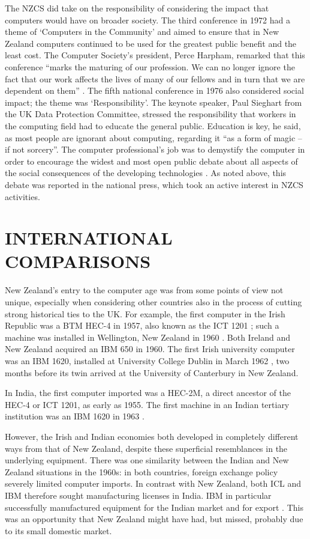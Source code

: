\documentclass{IEEEcsmag}
\begin{document}
The NZCS did take on the responsibility of considering the impact that computers would have on 
broader society. The third conference in 1972 had a theme of ‘Computers in the Community’ and
aimed to ensure that in New Zealand computers continued to be used for the greatest public benefit
and the least cost. The Computer Society’s president, Perce Harpham, remarked that this conference
“marks the maturing of our profession. We can no longer ignore the fact that our work affects the lives 
of many of our fellows and in turn that we are dependent on them” \cite{Harpham1972}. The fifth national conference in 
1976 also considered social impact; the theme was  ‘Responsibility’.  The keynote speaker, Paul Sieghart 
from the UK Data Protection Committee, stressed the responsibility that workers in the computing field 
had to educate the general public. Education is key, he said, as most people are ignorant about computing, 
regarding it “as a form of magic – if not sorcery”. The computer professional’s job was to demystify the 
computer in order to encourage the widest and most open public debate about all aspects of the social 
consequences of the developing technologies \cite{Sieghart1976}.
As noted above, this debate was reported in the national press, which took an active interest in NZCS activities.
\vspace*{-8pt}
\section{INTERNATIONAL COMPARISONS}
New Zealand’s entry to the computer age was from some points of view not unique,
especially when considering other countries also in the process of cutting strong historical ties to the UK.
For example, the first computer in the Irish Republic was a BTM HEC-4 in 1957,
also known as the ICT 1201 \cite{Ireland-first}; such a machine was installed in
Wellington, New Zealand in 1960 \cite{FirstCinNZ}. Both Ireland and New Zealand
acquired an IBM 650 in 1960. The first Irish university computer was an IBM 1620, 
installed at University College Dublin in March 1962 \cite{Ireland-first}, two months before its twin
arrived at the University of Canterbury in New Zealand.

In India, the first computer imported was a HEC-2M, a direct ancestor of the HEC-4 or ICT 1201,
as early as 1955. The first machine in an Indian tertiary institution was an
IBM 1620 in 1963 \cite{Rajaraman-2015}. 

However, the Irish and Indian economies
both developed in completely different ways from that of New Zealand, despite
these superficial resemblances in the underlying equipment.
There was one similarity between the Indian and New Zealand
situations in the 1960s: in both countries, foreign exchange policy
severely limited computer imports. In contrast with New Zealand, both ICL 
and IBM therefore sought manufacturing licenses in India. IBM in particular successfully
manufactured equipment for the Indian market and for export \cite{Rajaraman-2015}. 
This was an opportunity that New Zealand might have had, but missed, probably due to its small domestic market.
\end{document}
